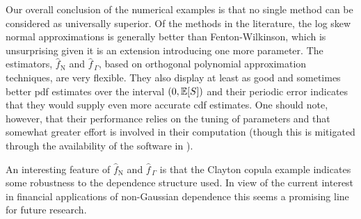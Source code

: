 


Our overall conclusion of the numerical examples is that no single method can
be considered as universally superior. Of the methods in the literature,
the log skew normal approximations is generally better than Fenton-Wilkinson,
which is unsurprising given it is an extension introducing one more parameter.
The estimators, $\widehat{f}_{\mathrm{N}}$ and $\widehat{f}_{\,\Gamma}$, based on orthogonal polynomial approximation techniques, are very flexible. They also display at least as good and sometimes better pdf estimates over the interval $(0, \operatorname{{\mathbb E}}[S])$ and their periodic error indicates that they would supply even more accurate cdf estimates. One should note, however, that their
performance relies on the tuning of parameters and that somewhat
greater effort is involved in their computation (though this is mitigated through the availability
of the software in \cite{OrthogoCode}).

An interesting feature of $\widehat{f}_{\mathrm{N}}$ and $\widehat{f}_{\,\Gamma}$ is that
the Clayton copula example indicates some robustness to the dependence structure used.
In view of the current interest in financial applications of non-Gaussian dependence this
seems a promising line for future research.


